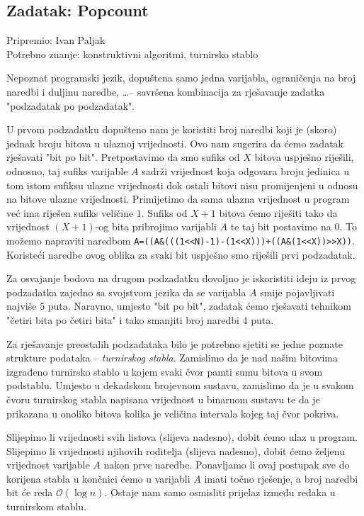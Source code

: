 \documentclass[a4paper]{article}
\begin{document}
\subsection*{Zadatak: Popcount}
\textsf{Pripremio: Ivan Paljak}\\
\textsf{Potrebno znanje: konstruktivni algoritmi, turnirsko stablo}

Nepoznat programski jezik, dopuštena samo jedna varijabla, ograničenja na broj
naredbi i duljinu naredbe, \dots -- savršena kombinacija za rješavanje zadatka
"podzadatak po podzadatak".

U prvom podzadatku dopušteno nam je koristiti broj naredbi koji je (skoro)
jednak broju bitova u ulaznoj vrijednosti. Ovo nam sugerira da ćemo zadatak
rješavati "bit po bit". Pretpostavimo da smo sufiks od $X$ bitova uspješno
riješili, odnosno, taj sufiks varijable $A$ sadrži vrijednost koja odgovara
broju jedinica u tom istom sufiksu ulazne vrijednosti dok ostali
bitovi nisu promijenjeni u odnosu na bitove ulazne vrijednosti. Primijetimo da
sama ulazna vrijednost u program već ima riješen sufiks veličine $1$. Sufiks od
$X+1$ bitova ćemo riješiti tako da vrijednost $(X+1)$-og bita pribrojimo
varijabli $A$ te taj bit postavimo na $0$. To možemo napraviti naredbom
\verb|A=((A&(((1<<N)-1)-(1<<X)))+((A&(1<<X))>>X))|. Koristeći naredbe ovog
oblika za svaki bit uspješno smo riješili prvi podzadatak.

Za osvajanje bodova na drugom podzadatku dovoljno je iskoristiti ideju iz prvog
podzadatka zajedno sa svojstvom jezika da se varijabla $A$ smije pojavljivati
najviše $5$ puta. Naravno, umjesto "bit po bit", zadatak ćemo rješavati
tehnikom "četiri bita po četiri bita" i tako smanjiti broj naredbi $4$ puta.

Za rješavanje preostalih podzadataka bilo je potrebno sjetiti se jedne poznate
strukture podataka -- \textit{turnirskog stabla}. Zamislimo da je nad našim
bitovima izgrađeno turnirsko stablo u kojem svaki čvor pamti sumu bitova u svom
podstablu. Umjesto u dekadskom brojevnom sustavu, zamislimo da je u svakom čvoru
turnirskog stabla napisana vrijednost u binarnom sustavu te da je prikazana u
onoliko bitova kolika je veličina intervala kojeg taj čvor pokriva.

Slijepimo li vrijednosti svih listova (slijeva nadesno), dobit ćemo ulaz u
program.  Slijepimo li vrijednosti njihovih roditelja (slijeva nadesno), dobit
ćemo željenu vrijednost varijable $A$ nakon prve naredbe. Ponavljamo li ovaj
postupak sve do korijena stabla u končnici ćemo u varijabli $A$ imati
točno rješenje, a broj naredbi bit će reda $\mathcal{O}(\log n)$. Ostaje nam
samo osmisliti prijelaz između redaka u turnirskom stablu.
\end{document}
